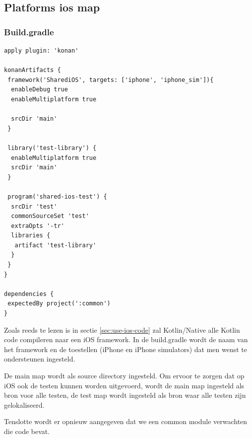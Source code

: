 \subsection{Platforms ios map}
\subsubsection{Build.gradle}
\label{sec:ios-build-gradle}
\begin{lstlisting}
apply plugin: 'konan'

konanArtifacts {
 framework('SharediOS', targets: ['iphone', 'iphone_sim']){
  enableDebug true
  enableMultiplatform true

  srcDir 'main'
 }

 library('test-library') {
  enableMultiplatform true
  srcDir 'main'
 }

 program('shared-ios-test') {
  srcDir 'test'
  commonSourceSet 'test'
  extraOpts '-tr'
  libraries {
   artifact 'test-library'
  }
 }
}

dependencies {
 expectedBy project(':common')
}
\end{lstlisting}

Zoals reeds te lezen is in sectie \ref{sec:use-ios-code} zal Kotlin/Native alle Kotlin code compileren naar een iOS framework. In de build.gradle wordt de naam van het framework en de toestellen (iPhone en iPhone simulators) dat men wenst te ondersteunen ingesteld.

De main map wordt als source directory ingesteld. Om ervoor te zorgen dat op iOS ook de testen kunnen worden uitgevoerd, wordt de main map ingesteld als bron voor alle testen, de test map wordt ingesteld als bron waar alle testen zijn gelokaliseerd.

Tenslotte wordt er opnieuw aangegeven dat we een common module verwachten die code bevat.

